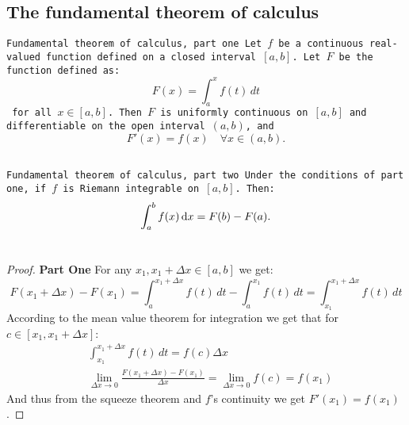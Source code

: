 \documentclass[11pt,a4paper]{article}
\begin{document}
  \subsection{The fundamental theorem of calculus}
  \begin{theorem}\tt{Fundamental theorem of calculus, part one}
    Let $f$ be a continuous real-valued function
    defined on a closed interval $[a, b]$. 
    Let $F$ be the function defined as:
    \[
      F(x) = \int_{a}^{x} f(t)\,dt
    \]
    for all $x \in [a, b]$.
    Then $F$ is uniformly continuous on $[a, b]$ and 
    differentiable on the open interval $(a, b)$, and
    \[
      F'(x) = f(x) \quad \forall x \in (a, b).
    \]
  \end{theorem}
  \begin{theorem}\tt{Fundamental theorem of calculus, part two}
    Under the conditions of part one, if $f$ is Riemann integrable on $[a,b]$.
    Then:
    \[
      \int_{a}^{b} f(x)\dx = F(b) - F(a).
    \]
  \end{theorem}
  \begin{proof}
  \textbf{Part One}
  For any $x_1, x_1+\Delta x\in [a,b]$ we get:
  \[
    F(x_1 + \Delta x) - F(x_1) = 
    \int_{a}^{x_1 + \Delta x}{f(t)\,dt} - \int_{a}^{x_1}{f(t)\,dt} = 
    \int_{x_1}^{x_1 + \Delta x}{f(t)\,dt}
  \]
  According to the mean value theorem for integration 
  we get that for $c \in [x_1, x_1+\Delta x]$:
  \begin{align*}
    &\int_{x_1}^{x_1 + \Delta x}{f(t)\,dt} = f(c)\Delta x \\
    &\lim_{\Delta x\to 0}{\frac{F(x_1+\Delta x) - F(x_1)}{\Delta x}}
    = \lim_{\Delta x\to 0}{f(c)}
    = f(x_1)
  \end{align*}
  And thus from the squeeze theorem and $f$'s continuity 
  we get $F'(x_1) = f(x_1)$.
  \end{proof}
\end{document}
